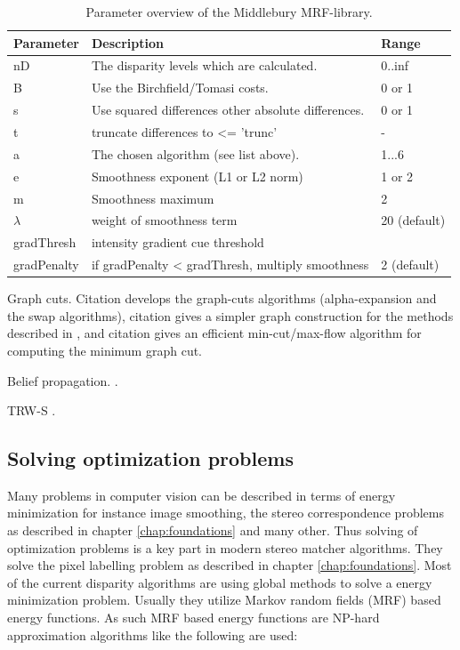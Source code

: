 \begin{table}[h!]
\centering
\begin{tabular}{l|l|l}
  \hline
  \textbf{Parameter} & \textbf{Description} & \textbf{Range} \\ \hline \hline
  nD & The disparity levels which are calculated. & 0..inf \\
  B & Use the Birchfield/Tomasi costs. & 0 or 1 \\
  s & Use squared differences other absolute differences. & 0 or 1 \\
  t & truncate differences to <= 'trunc' & - \\
  a & The chosen algorithm (see list above). & 1...6 \\
  e & Smoothness exponent (L1 or L2 norm) & 1 or 2 \\
  m & Smoothness maximum & 2 \\
  $\lambda$ & weight of smoothness term & 20 (default) \\
  gradThresh & intensity gradient cue threshold & \\
  gradPenalty & if gradPenalty < gradThresh, multiply smoothness & 2 (default) \\ \hline
\end{tabular}
\caption{Parameter overview of the Middlebury MRF-library.}
\label{tab:parameter-middlebury-library}
\end{table}

Graph cuts.
Citation \citep{boykov2001fast} develops the graph-cuts algorithms (alpha-expansion and the swap algorithms), citation \citep{ramin2004energy} gives a simpler graph construction for the methods described in \citep{boykov2001fast}, and citation \citep{kolmogorov2004energy} gives an efficient min-cut/max-flow algorithm for computing the minimum graph cut.

Belief propagation.
\citep{tappen2003comparison}.

TRW-S \citep{kolmogorov2006convergent, wainwright2005map}.

\subsection{Solving optimization problems}

Many problems in computer vision can be described in terms of energy minimization for instance image smoothing, the stereo correspondence problems as described in chapter \ref{chap:foundations} and many other.
Thus solving of optimization problems is a key part in modern stereo matcher algorithms.
They solve the pixel labelling problem as described in chapter \ref{chap:foundations}.
Most of the current disparity algorithms are using global methods to solve a energy minimization problem.
Usually they utilize Markov random fields (MRF) based energy functions.
As such MRF based energy functions are NP-hard approximation algorithms like the following are used:

